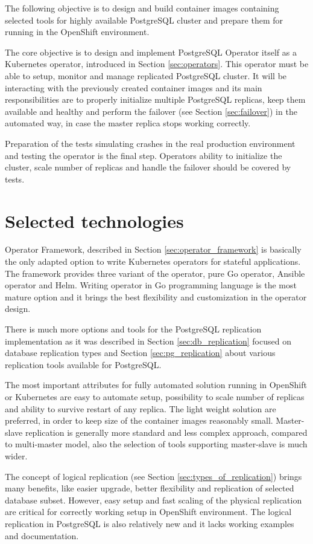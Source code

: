 \documentclass[
  digital, %
  twoside, %
  table,   %
  lof,     %
  lot,     %
]{fithesis3}
\begin{document}
The following objective is to design and build container images containing selected tools for highly available PostgreSQL cluster and prepare them for running in the OpenShift environment.

The core objective is to design and implement PostgreSQL Operator itself as a Kubernetes operator, introduced in Section \ref{sec:operators}. This operator must be able to setup, monitor and manage replicated PostgreSQL cluster. It will be interacting with the previously created container images and its main responsibilities are to properly initialize multiple PostgreSQL replicas, keep them available and healthy and perform the failover (see Section \ref{sec:failover}) in the automated way, in case the master replica stops working correctly.

Preparation of the tests simulating crashes in the real production environment and testing the operator is the final step. Operators ability to initialize the cluster, scale number of replicas and handle the failover should be covered by tests.

\section{Selected technologies}
Operator Framework, described in Section \ref{sec:operator_framework} is basically the only adapted option to write Kubernetes operators for stateful applications. The framework provides three variant of the operator, pure Go operator, Ansible operator and Helm. Writing operator in Go programming language is the most mature option and it brings the best flexibility and customization in the operator design.

There is much more options and tools for the PostgreSQL replication implementation as it was described in Section \ref{sec:db_replication} focused on database replication types and Section \ref{sec:pg_replication} about various replication tools available for PostgreSQL.

The most important attributes for fully automated solution running in OpenShift or Kubernetes are easy to automate setup, possibility to scale number of replicas and ability to survive restart of any replica. The light weight solution are preferred, in order to keep size of the container images reasonably small. Master-slave replication is generally more standard and less complex approach, compared to multi-master model, also the selection of tools supporting master-slave is much wider.

The concept of logical replication (see Section \ref{sec:types_of_replication}) brings many benefits, like easier upgrade, better flexibility and replication of selected database subset. However, easy setup and fast scaling of the physical replication are critical for correctly working setup in OpenShift environment. The logical replication in PostgreSQL is also relatively new and it lacks working examples and documentation.
\end{document}
